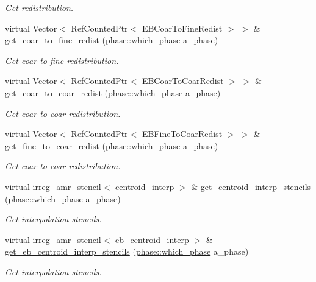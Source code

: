 \begin{DoxyCompactItemize}
\begin{DoxyCompactList}\small\item\em Get redistribution. \end{DoxyCompactList}\item 
virtual Vector$<$ Ref\+Counted\+Ptr$<$ E\+B\+Coar\+To\+Fine\+Redist $>$ $>$ \& \hyperlink{classamr__mesh_a1c66005248857950344a39ac41aad7f0}{get\+\_\+coar\+\_\+to\+\_\+fine\+\_\+redist} (\hyperlink{namespacephase_a23c76f548a5eb1955ed8c929c541108b}{phase\+::which\+\_\+phase} a\+\_\+phase)
\begin{DoxyCompactList}\small\item\em Get coar-\/to-\/fine redistribution. \end{DoxyCompactList}\item 
virtual Vector$<$ Ref\+Counted\+Ptr$<$ E\+B\+Coar\+To\+Coar\+Redist $>$ $>$ \& \hyperlink{classamr__mesh_a3b9f14849597fb4783b71fce43c14f40}{get\+\_\+coar\+\_\+to\+\_\+coar\+\_\+redist} (\hyperlink{namespacephase_a23c76f548a5eb1955ed8c929c541108b}{phase\+::which\+\_\+phase} a\+\_\+phase)
\begin{DoxyCompactList}\small\item\em Get coar-\/to-\/coar redistribution. \end{DoxyCompactList}\item 
virtual Vector$<$ Ref\+Counted\+Ptr$<$ E\+B\+Fine\+To\+Coar\+Redist $>$ $>$ \& \hyperlink{classamr__mesh_a58db556bc2f778352977c3482cc0dfc9}{get\+\_\+fine\+\_\+to\+\_\+coar\+\_\+redist} (\hyperlink{namespacephase_a23c76f548a5eb1955ed8c929c541108b}{phase\+::which\+\_\+phase} a\+\_\+phase)
\begin{DoxyCompactList}\small\item\em Get coar-\/to-\/coar redistribution. \end{DoxyCompactList}\item 
virtual \hyperlink{classirreg__amr__stencil}{irreg\+\_\+amr\+\_\+stencil}$<$ \hyperlink{classcentroid__interp}{centroid\+\_\+interp} $>$ \& \hyperlink{classamr__mesh_a627f1d201902b060f6256e3ef0b2d613}{get\+\_\+centroid\+\_\+interp\+\_\+stencils} (\hyperlink{namespacephase_a23c76f548a5eb1955ed8c929c541108b}{phase\+::which\+\_\+phase} a\+\_\+phase)
\begin{DoxyCompactList}\small\item\em Get interpolation stencils. \end{DoxyCompactList}\item 
virtual \hyperlink{classirreg__amr__stencil}{irreg\+\_\+amr\+\_\+stencil}$<$ \hyperlink{classeb__centroid__interp}{eb\+\_\+centroid\+\_\+interp} $>$ \& \hyperlink{classamr__mesh_a1b50d1721e8cbf43a7ef82917ec2e3bc}{get\+\_\+eb\+\_\+centroid\+\_\+interp\+\_\+stencils} (\hyperlink{namespacephase_a23c76f548a5eb1955ed8c929c541108b}{phase\+::which\+\_\+phase} a\+\_\+phase)
\begin{DoxyCompactList}\small\item\em Get interpolation stencils. \end{DoxyCompactList}\end{DoxyCompactItemize}
